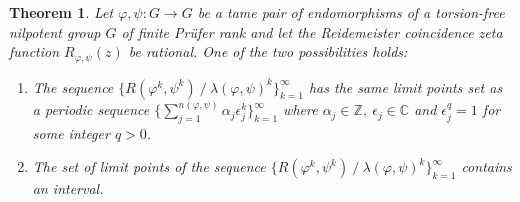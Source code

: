 \documentclass[12pt, a4paper]{amsart}
\def\C{{\mathbb C}}
\def\Z{{\mathbb Z}}
\newtheorem{theorem}{Theorem}
\begin{document}
\begin{theorem}\label{thm:coincidence-reidemeister-asymptotic-sequence}
  Let $\varphi, \psi: G \to G$ be a tame pair of endomorphisms of a torsion-free nilpotent group $G$
  of finite Pr\"ufer rank and let the Reidemeister coincidence zeta function $R_{\varphi, \psi}(z)$ be rational.
  One of the two possibilities holds:
  \begin{enumerate}
    \item[(i)] The sequence $\{ R(\varphi^k, \psi^k) \ / \ \lambda(\varphi, \psi)^k \}_{k=1}^\infty$ has the same
      limit points set as a periodic sequence $\{ \sum_{j=1}^{n(\varphi, \psi)} \alpha_j \epsilon_j^k \}_{k=1}^\infty$
      where $\alpha_j \in \Z, \ \epsilon_j \in \C$ and $\epsilon_j^q = 1$ for some integer $q>0$.
    \item[(ii)] The set of limit points of the sequence $\{ R(\varphi^k, \psi^k) \ / \ \lambda(\varphi, \psi)^k \}_{k=1}^\infty$
      contains an interval.
  \end{enumerate}
\end{theorem}
\end{document}
